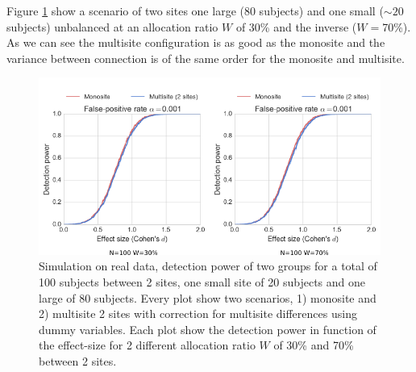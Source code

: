 \documentclass[authoryear]{elsarticle}
\begin{document}
Figure \ref{fig_real_sim_debalancing_2sites} show a scenario of two sites one large (80 subjects) and one small ($\sim20$ subjects) unbalanced at an allocation ratio $W$ of 30\% and the inverse ($W=$70\%). As we can see the multisite configuration is as good as the monosite and the variance between connection is of the same order for the monosite and multisite.

\begin{figure}[tbp]
\centering
\captionsetup[subfloat]{labelformat=empty}
\includegraphics[width=.75\textwidth]{../figures/simulations_real_2sites.png}
\caption{
Simulation on real data, detection power of two groups for a total of 100 subjects between 2 sites, one small site of 20 subjects and one large of 80 subjects. Every plot show two scenarios, 1) monosite and 2) multisite 2 sites with correction for multisite differences using dummy variables. Each plot show the detection power in function of the effect-size for 2 different allocation ratio $W$ of 30\% and 70\% between 2 sites.
}
\label{fig_real_sim_debalancing_2sites}
\end{figure}
\end{document}
